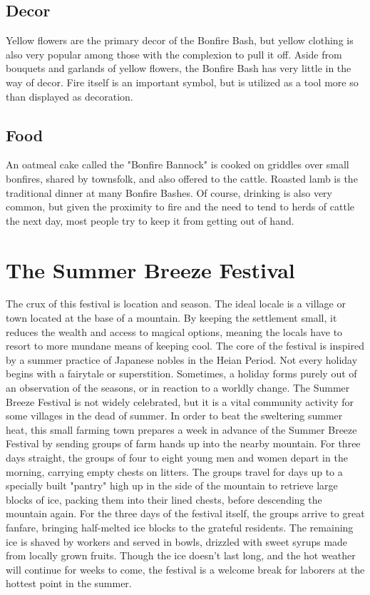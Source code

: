 \documentclass[10pt,a4paper,twoside,bg=print,twocolumn,openany,nodeprecatedcode]{dndbook}
\begin{document}
\subsection{Decor}
Yellow flowers are the primary decor of the Bonfire Bash, but yellow clothing is also very popular among those with the complexion to pull it off. Aside from bouquets and garlands of yellow flowers, the Bonfire Bash has very little in the way of decor. Fire itself is an important symbol, but is utilized as a tool more so than displayed as decoration.
\subsection{Food}
An oatmeal cake called the "Bonfire Bannock" is cooked on griddles over small bonfires, shared by townsfolk, and also offered to the cattle. Roasted lamb is the traditional dinner at many Bonfire Bashes. Of course, drinking is also very common, but given the proximity to fire and the need to tend to herds of cattle the next day, most people try to keep it from getting out of hand.
\section{The Summer Breeze Festival}
The crux of this festival is location and season. The ideal locale is a village or town located at the base of a mountain. By keeping the settlement small, it reduces the wealth and access to magical options, meaning the locals have to resort to more mundane means of keeping cool. The core of the festival is inspired by a summer practice of Japanese nobles in the Heian Period.
Not every holiday begins with a fairytale or superstition. Sometimes, a holiday forms purely out of an observation of the seasons, or in reaction to a worldly change. The Summer Breeze Festival is not widely celebrated, but it is a vital community activity for some villages in the dead of summer. In order to beat the sweltering summer heat, this small farming town prepares a week in advance of the Summer Breeze Festival by sending groups of farm hands up into the nearby mountain. For three days straight, the groups of four to eight young men and women depart in the morning, carrying empty chests on litters. The groups travel for days up to a specially built "pantry" high up in the side of the mountain to retrieve large blocks of ice, packing them into their lined chests, before descending the mountain again.
For the three days of the festival itself, the groups arrive to great fanfare, bringing half-melted ice blocks to the grateful residents. The remaining ice is shaved by workers and served in bowls, drizzled with sweet syrups made from locally grown fruits. Though the ice doesn't last long, and the hot weather will continue for weeks to come, the festival is a welcome break for laborers at the hottest point in the summer.
\end{document}
